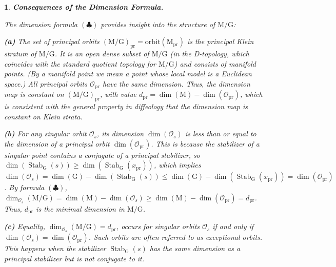 \documentclass[10pt,reqno,letterpaper,twoside]{amsart}
\theoremstyle{article}
\newtheorem{article}{}
\def\artlabel[#1]{\textbf{#1.}}
\newcommand{\cO}{{\mathcal O}}
\def \G{\mathrm G}
\def \M{\mathrm M}
\DeclareMathOperator{\Stab}{Stab}
\newcommand{\orbit}{{\mathrm{orbit}}}
\begin{document}
  \begin{article}
    \artlabel[Consequences of the Dimension Formula]
    \label{Consequences_of_Dimension_Formula}
    
    The dimension formula $(\clubsuit)$ provides insight into the structure of $\M/\G$:
    
    \textbf{(a)} The set of principal orbits $(\M/\G)_{\mathrm{pr}} = \orbit(\M_{\mathrm{pr}})$ is the \emph{principal Klein stratum} of $\M/\G$.
    It is an open dense subset of $\M/\G$
    (in the D-topology, which coincides with the standard quotient topology for $\M/\G$)
    and consists of manifold points.
    (By a manifold point we mean a point whose local model is a Euclidean space.)
    All principal orbits $\cO_{\mathrm{pr}}$ have the same dimension.
    Thus,
    the dimension map is constant on $(\M/\G)_{\mathrm{pr}}$,
    with value $d_{\mathrm{pr}} = \dim(\M) - \dim(\cO_{\mathrm{pr}})$,
    which is consistent with the general property in diffeology that the dimension map is constant on Klein strata.
    
    \textbf{(b)} For any singular orbit $\cO_s$,
    its dimension $\dim(\cO_s)$ is less than or equal to the dimension of a principal orbit $\dim(\cO_{\mathrm{pr}})$.
    This is because the stabilizer of a singular point contains a conjugate of a principal stabilizer,
    so $\dim(\Stab_\G(s)) \ge \dim(\Stab_\G(x_{\mathrm{pr}}))$,
    which implies $\dim(\cO_s) = \dim(\G) - \dim(\Stab_\G(s)) \le \dim(\G) - \dim(\Stab_\G(x_{\mathrm{pr}})) = \dim(\cO_{\mathrm{pr}})$.
    By formula $(\clubsuit)$, $\dim_{\cO_s}(\M/\G) = \dim(\M) - \dim(\cO_s) \ge \dim(\M) - \dim(\cO_{\mathrm{pr}}) = d_{\mathrm{pr}}$.
    Thus,
    $d_{\mathrm{pr}}$ is the minimal dimension in $\M/\G$.
    
    \textbf{(c)} Equality,
    $\dim_{\cO_s}(\M/\G) = d_{\mathrm{pr}}$,
    occurs for singular orbits $\cO_s$ if and only if $\dim(\cO_s) = \dim(\cO_{\mathrm{pr}})$.
    Such orbits are often referred to as \emph{exceptional orbits}.
    This happens when the stabilizer $\Stab_\G(s)$ has the same dimension as a principal stabilizer but is not conjugate to it.
    
  \end{article}
  
  
\end{document}

